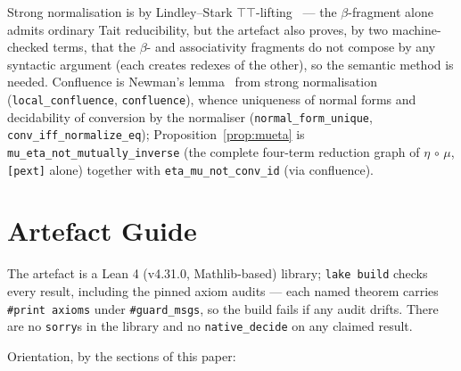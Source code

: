 \noindent Strong normalisation is by Lindley--Stark
\ensuremath{\top\top}-lifting~\cite{LindleyStark2005} --- the \ensuremath{\beta}-fragment
alone admits ordinary Tait reducibility, but the artefact also proves,
by two machine-checked terms, that the \ensuremath{\beta}- and associativity
fragments do not compose by any syntactic argument (each creates
redexes of the other), so the semantic method is needed. Confluence is
Newman's lemma~\cite{Newman1942} from strong normalisation
(\texttt{local\_confluence}, \texttt{confluence}), whence uniqueness of
normal forms and decidability of conversion by the normaliser
(\texttt{normal\_form\_unique}, \texttt{conv\_iff\_normalize\_eq});
Proposition~\ref{prop:mueta} is \texttt{mu\_eta\_not\_mutually\_inverse}
(the complete four-term reduction graph of \ensuremath{\eta} \ensuremath{\circ}
\ensuremath{\mu}, \texttt{[pext]} alone) together with
\texttt{eta\_mu\_not\_conv\_id} (via confluence).

\section{Artefact Guide}\label{app:artefact}

The artefact is a Lean 4 (v4.31.0, Mathlib-based) library; \texttt{lake
build} checks every result, including the pinned axiom audits — each
named theorem carries \texttt{\#print axioms} under
\texttt{\#guard\_msgs}, so the build fails if any audit drifts. There
are no \texttt{sorry}s in the library and no \texttt{native\_decide} on
any claimed result.

\medskip
\noindent Orientation, by the sections of this paper:

